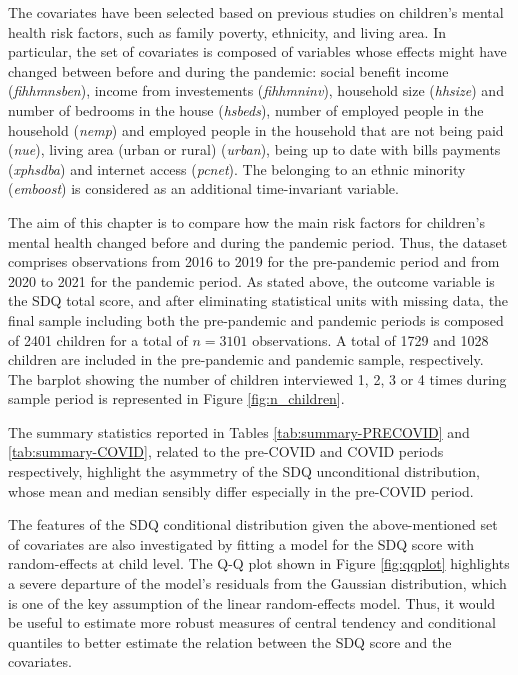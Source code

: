 \noindent The covariates have been selected based on previous studies on children's mental health risk factors, such as family poverty, ethnicity, and living area. In particular, the set of covariates is composed of variables whose effects might have changed between before and during the pandemic: social benefit income (\textit{fihhmnsben}), income from investements (\textit{fihhmninv}),  household size (\textit{hhsize}) and number of bedrooms in the house (\textit{hsbeds}), number of employed people in the household (\textit{nemp}) and employed people in the household that are not being paid (\textit{nue}), living area (urban or rural) (\textit{urban}), being up to date with bills payments (\textit{xphsdba}) and internet access (\textit{pcnet}).
The belonging to an ethnic minority (\textit{emboost}) is considered as an additional time-invariant variable.


\vspace{0.15in}

\noindent The aim of this chapter is to compare how the main risk factors for children's mental health changed before and during the pandemic period.
Thus, the dataset comprises observations from 2016 to 2019 for the pre-pandemic period and from 2020 to 2021 for the pandemic period.
As stated above, the outcome variable is the SDQ total score, and after eliminating statistical units with missing data, the final sample including both the pre-pandemic and pandemic periods is composed of 2401 children for a total of $n=3101$ observations. A total of 1729 and 1028 children are included in the pre-pandemic and pandemic sample, respectively. The barplot showing the number of children interviewed 1, 2, 3 or 4
times during sample period is represented in Figure \ref{fig:n_children}.

\vspace{0.15in}

\noindent The summary statistics reported in Tables \ref{tab:summary-PRECOVID} and \ref{tab:summary-COVID}, related to the pre-COVID and COVID periods respectively, highlight the asymmetry of the SDQ unconditional distribution, whose mean and median sensibly differ especially in the pre-COVID period.




\vspace{0.15in}

\noindent The features of the SDQ conditional distribution given the above-mentioned set of covariates are also investigated by fitting a model for the SDQ score with random-effects at child level. The Q-Q plot shown in Figure \ref{fig:qqplot} highlights a severe departure of the model's residuals from the Gaussian distribution, which is one of the key assumption of the linear random-effects model. Thus, it would be useful to estimate more robust measures of central tendency and conditional quantiles to better estimate the relation between the SDQ score and the covariates.

